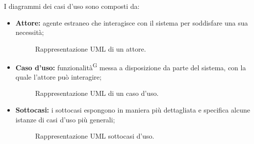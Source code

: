 \documentclass[8pt]{article}
\newcommand{\glossterm}[1]{#1\textsuperscript{G}} %
\begin{document}
\\\\
I diagrammi dei casi d'uso sono composti da:\\
\begin{itemize}
    \item \textbf{Attore:} agente estraneo che interagisce con il sistema per soddisfare una sua necessità;
        \begin{figure}[H]
            \centering
            \caption{Rappresentazione UML di un attore.}
            \label{fig:Rappresentazione UML di un attore}
        \end{figure}
    \item \textbf{Caso d'uso:} \glossterm{funzionalità} messa a disposizione da parte del sistema, con la quale l'attore può interagire;
        \begin{figure}[H]
        \centering
        \caption{Rappresentazione UML di un caso d'uso.}
        \label{fig:Rappresentazione UML di un caso d'uso}
        \end{figure}
    \item \textbf{Sottocasi:} i sottocasi espongono in maniera più dettagliata e specifica alcune istanze di casi d'uso più generali; 
    \begin{figure}[H]
        \centering
        \caption{Rappresentazione UML sottocasi d'uso.}
        \label{fig:Rappresentazione UML sottocasi d'uso}
    \end{figure}

\end{itemize}
\end{document}
